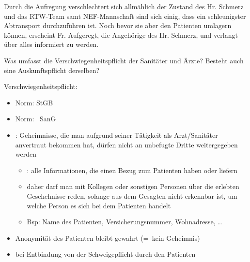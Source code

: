 Durch die Aufregung verschlechtert sich allmählich der Zustand des Hr.
Schmerz und das RTW-Team samt NEF-Mannschaft sind sich einig, dass ein
schleunigster Abtransport durchzuf\"uhren ist. Noch bevor sie aber den
Patienten umlagern k\"onnen, erscheint Fr. Aufgeregt, die
Angeh\"orige des Hr. Schmerz, und verlangt \"uber alles informiert zu werden.


Was umfasst die Verschwiegenheitspflicht der Sanitäter und \"Arzte?
Besteht auch eine Auskunftspflicht derselben?


Verschwiegenheitspflicht:

\begin{itemize}
    \item {\mdseries
     Norm:  StGB}
    
    \item {\mdseries
     Norm: ~SanG}
    
    \item {\mdseries
    : Geheimnisse, die man aufgrund seiner
    Tätigkeit als Arzt/Sanitäter anvertraut bekommen hat, d\"urfen
    nicht an unbefugte Dritte weitergegeben werden}
    
    \begin{itemize}
        
        \item {}: alle Informationen, die
        einen Bezug zum Patienten haben oder liefern
        
        \item {\mdseries
        daher darf man mit Kollegen oder sonstigen Personen \"uber die erlebten
        Geschehnisse reden, solange aus dem Gesagten nicht erkennbar ist, um
        welche Person es sich bei dem Patienten handelt }
        
        \item {\mdseries
        Bsp: Name des Patienten, Versicherungsnummer, Wohnadresse,
        {\dots}}
        
    \end{itemize}
    
\end{itemize}


\begin{itemize}
    \item Anonymität des Patienten bleibt gewahrt (=~kein
    Geheimnis)
    
    \item {\mdseries
    bei Entbindung von der Schweigepflicht durch den Patienten}
    
\end{itemize}

